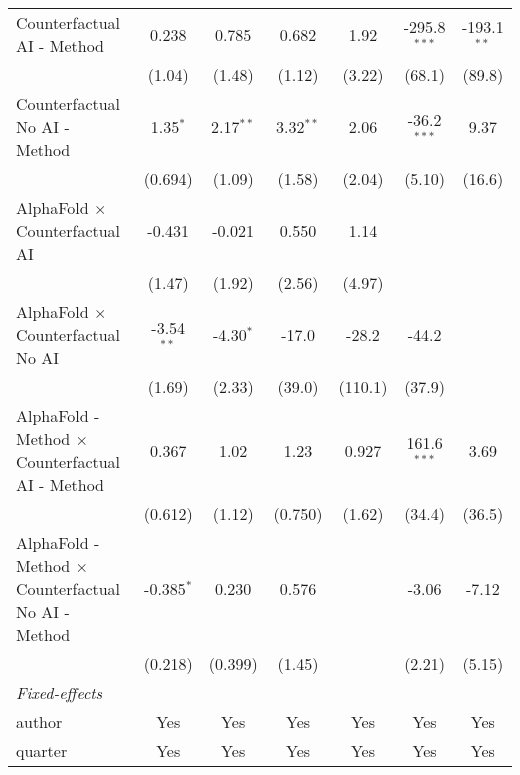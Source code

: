 \begin{tabular}{lcccccc}
   Counterfactual AI - Method                                 & 0.238        & 0.785       & 0.682       & 1.92       & -295.8$^{***}$ & -193.1$^{**}$\\   
                                                              & (1.04)       & (1.48)      & (1.12)      & (3.22)     & (68.1)         & (89.8)\\   
   Counterfactual No AI - Method                              & 1.35$^{*}$   & 2.17$^{**}$ & 3.32$^{**}$ & 2.06       & -36.2$^{***}$  & 9.37\\   
                                                              & (0.694)      & (1.09)      & (1.58)      & (2.04)     & (5.10)         & (16.6)\\   
   AlphaFold $\times$ Counterfactual AI                       & -0.431       & -0.021      & 0.550       & 1.14       &                &   \\   
                                                              & (1.47)       & (1.92)      & (2.56)      & (4.97)     &                &   \\   
   AlphaFold $\times$ Counterfactual No AI                    & -3.54$^{**}$ & -4.30$^{*}$ & -17.0       & -28.2      & -44.2          &   \\   
                                                              & (1.69)       & (2.33)      & (39.0)      & (110.1)    & (37.9)         &   \\   
   AlphaFold - Method $\times$ Counterfactual AI - Method     & 0.367        & 1.02        & 1.23        & 0.927      & 161.6$^{***}$  & 3.69\\   
                                                              & (0.612)      & (1.12)      & (0.750)     & (1.62)     & (34.4)         & (36.5)\\   
   AlphaFold - Method $\times$ Counterfactual No AI - Method  & -0.385$^{*}$ & 0.230       & 0.576       &            & -3.06          & -7.12\\   
                                                              & (0.218)      & (0.399)     & (1.45)      &            & (2.21)         & (5.15)\\   
   \midrule
   \emph{Fixed-effects}\\
   author                                                     & Yes          & Yes         & Yes         & Yes        & Yes            & Yes\\  
   quarter                                                    & Yes          & Yes         & Yes         & Yes        & Yes            & Yes\\  

\end{tabular}
